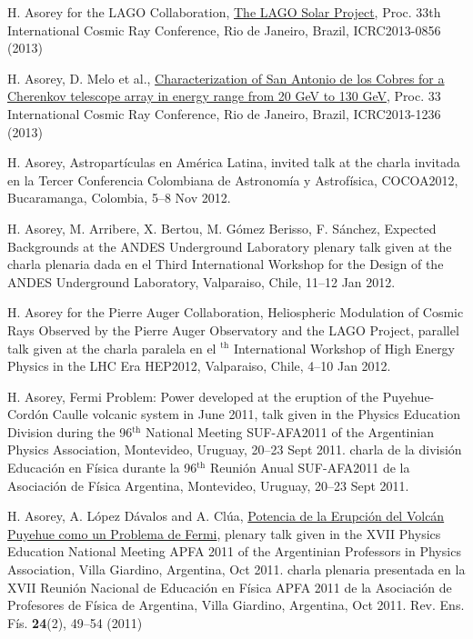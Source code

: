 \begin{etaremune}
\item {}H. Asorey for the LAGO Collaboration, \href{https://www.cbpf.br/~icrc2013/papers/icrc2013-0856.pdf}{The LAGO Solar Project}, \en Proc. 33th International Cosmic Ray Conference, Rio de Janeiro, Brazil, ICRC2013-0856 (2013)

\item {}H. Asorey, D. Melo {{et al.}}, \href{https://www.cbpf.br/~icrc2013/papers/icrc2013-1236.pdf}{Characterization of San Antonio de los Cobres for a Cherenkov telescope array in energy range from 20 GeV to 130 GeV}, \en Proc. 33 International Cosmic Ray Conference, Rio de Janeiro, Brazil, ICRC2013-1236 (2013)

\item {} H. Asorey, {{Astropartículas en América Latina}}, 
\ifeng
invited talk at the
\else
charla invitada en la 
\fi
Tercer Conferencia Colombiana de Astronomía y Astrofísica, COCOA2012, Bucaramanga, Colombia, 5--8 Nov 2012.

\item {} H. Asorey, M. Arribere, X. Bertou, M. Gómez Berisso, F. Sánchez,
{{Expected Backgrounds at the ANDES Underground Laboratory}}
\ifeng
plenary talk given at the
\else
charla plenaria dada en el
\fi
Third International Workshop for the Design of the ANDES Underground Laboratory, Valparaiso, Chile, 11--12 Jan 2012.

\item {}H. Asorey for the Pierre Auger Collaboration, {{Heliospheric
Modulation of Cosmic Rays Observed by the Pierre Auger Observatory and the LAGO
Project}}, 
\ifeng
parallel talk given at the 
\else
charla paralela en el 
$^{\mathrm{th}}$ International Workshop of High Energy Physics in the LHC Era HEP2012, Valparaiso, Chile, 4--10 Jan 2012.

\item {}H. Asorey, {{Fermi Problem: Power developed at the eruption of the Puyehue-Cordón Caulle volcanic system in June 2011}}, 
\ifeng
talk given in the Physics Education Division during the 96$^{\mathrm{th}}$ National Meeting SUF-AFA2011 of the Argentinian Physics Association, Montevideo, Uruguay, 20--23 Sept 2011.
\else
charla de la división Educación en Física durante la 96$^{\mathrm{th}}$ Reunión Anual SUF-AFA2011 de la Asociación de Física Argentina, Montevideo, Uruguay, 20--23 Sept 2011.
\fi

\item {}H. Asorey, A. López Dávalos and A. Clúa, \href{https://dialnet.unirioja.es/servlet/articulo?codigo=4026852}{{Potencia de la Erupción del Volcán Puyehue como un Problema de Fermi}},
\ifeng
plenary talk given in the XVII Physics Education National Meeting APFA 2011 of the Argentinian Professors in Physics Association, Villa Giardino, Argentina, Oct 2011.
\else
charla plenaria presentada en la XVII Reunión Nacional de Educación en Física APFA 2011 de la Asociación de Profesores de Física de Argentina, Villa Giardino, Argentina, Oct 2011.
\fi
Rev.
Ens.
Fís. {\textbf{24}}(2), 49--54 (2011)


\end{etaremune}
